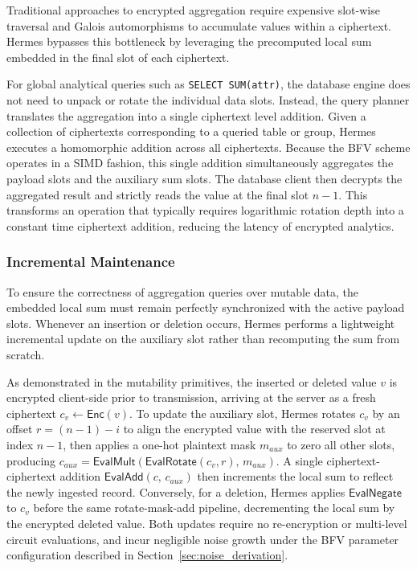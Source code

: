 \documentclass[sigconf,nonacm]{acmart}
\begin{document}
Traditional approaches to encrypted aggregation require expensive slot-wise traversal and Galois automorphisms to accumulate values within a ciphertext. Hermes bypasses this bottleneck by leveraging the precomputed local sum embedded in the final slot of each ciphertext.

For global analytical queries such as \texttt{SELECT SUM(attr)}, the database engine does not need to unpack or rotate the individual data slots. Instead, the query planner translates the aggregation into a single ciphertext level addition. Given a collection of ciphertexts corresponding to a queried table or group, Hermes executes a homomorphic addition across all ciphertexts. Because the BFV scheme operates in a SIMD fashion, this single addition simultaneously aggregates the payload slots and the auxiliary sum slots. The database client then decrypts the aggregated result and strictly reads the value at the final slot $n-1$. This transforms an operation that typically requires logarithmic rotation depth into a constant time ciphertext addition, reducing the latency of encrypted analytics. 

\subsubsection{Incremental Maintenance}

To ensure the correctness of aggregation queries over mutable data, the embedded local sum must remain perfectly synchronized with the active payload slots. Whenever an insertion or deletion occurs, Hermes performs a lightweight incremental update on the auxiliary slot rather than recomputing the sum from scratch.

As demonstrated in the mutability primitives, the inserted or deleted value $v$ is encrypted client-side prior to transmission, 
arriving at the server as a fresh ciphertext $c_v \leftarrow \mathsf{Enc}(v)$.
To update the auxiliary slot, Hermes rotates $c_v$ by an offset $r = (n-1) - i$ to align the encrypted value with the reserved slot at index $n-1$, 
then applies a one-hot plaintext mask $m_{\mathit{aux}}$ to zero all other slots, 
producing $c_{\mathit{aux}} = \mathsf{EvalMult}(\mathsf{EvalRotate}(c_v, r),\, m_{\mathit{aux}})$.
A single ciphertext-ciphertext addition $\mathsf{EvalAdd}(c,\, c_{\mathit{aux}})$ then increments the local sum to reflect the newly ingested record.
Conversely, for a deletion, Hermes applies $\mathsf{EvalNegate}$ to $c_v$ before the same rotate-mask-add pipeline, 
decrementing the local sum by the encrypted deleted value.
Both updates require no re-encryption or multi-level circuit evaluations, 
and incur negligible noise growth under the BFV
parameter configuration described in Section~\ref{sec:noise_derivation}.
\end{document}
